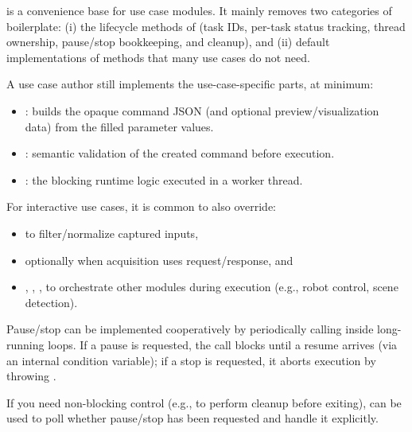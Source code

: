  is a convenience base for use case modules. It mainly removes two categories of boilerplate:
(i) the  lifecycle methods of  (task IDs, per-task status tracking, thread ownership, pause/stop bookkeeping, and  cleanup), and
(ii) default implementations of  methods that many use cases do not need.

A use case author still implements the use-case-specific parts, at minimum:
\begin{itemize}
    \item {}: builds the opaque command JSON (and optional preview/visualization data) from the filled parameter values.
    \item {}: semantic validation of the created command before execution.
    \item {}: the blocking runtime logic executed in a worker thread.
\end{itemize}

For interactive use cases, it is common to also override:
\begin{itemize}
    \item {} to filter/normalize captured inputs,
    \item optionally  when  acquisition uses request/response, and
    \item {}, , ,  to orchestrate other modules during execution (e.g., robot control, scene detection).
\end{itemize}

Pause/stop can be implemented cooperatively by periodically calling  inside long-running loops. If a pause is requested, the call blocks until a resume arrives (via an internal condition variable); if a stop is requested, it aborts execution by throwing .

If you need non-blocking control (e.g., to perform cleanup before exiting),  can be used to poll whether pause/stop has been requested and handle it explicitly.

